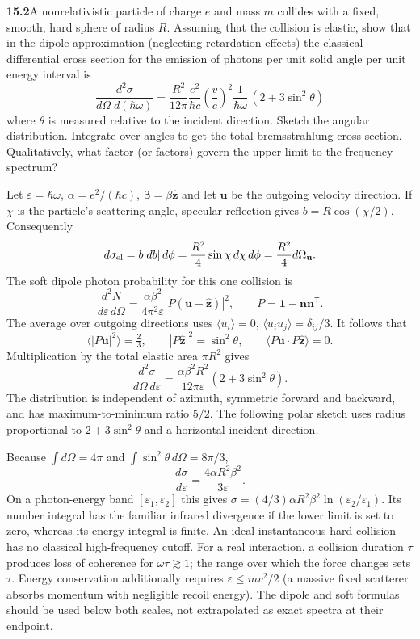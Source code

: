 \par\bigskip
\noindent\textbf{15.2}\quad A nonrelativistic particle of charge $e$ and mass $m$ collides with a fixed, smooth, hard sphere of radius $R$. Assuming that the collision is elastic, show that in the dipole approximation (neglecting retardation effects) the classical differential cross section for the emission of photons per unit solid angle per unit energy interval is
\[
\frac{d^{2}\sigma}{d\Omega\;d(\hbar\omega)}=\frac{R^{2}}{12\pi}\frac{e^{2}}{\hbar c}\left(\frac{v}{c}\right)^{2}\frac{1}{\hbar\omega}\,(2+3\sin^{2}\theta)
\]
where $\theta$ is measured relative to the incident direction. Sketch the angular distribution. Integrate over angles to get the total bremsstrahlung cross section. Qualitatively, what factor (or factors) govern the upper limit to the frequency spectrum?
\solution

Let $\varepsilon=\hbar\omega$, $\alpha=e^2/(\hbar c)$,
$\boldsymbol\beta=\beta\widehat{\mathbf z}$ and let
$\mathbf u$ be the outgoing velocity direction.  If $\chi$ is the
particle's scattering angle, specular reflection gives
$b=R\cos(\chi/2)$.  Consequently
\[
 d\sigma_{\rm el}=b|db|\,d\phi
 =\frac{R^2}4\sin\chi\,d\chi\,d\phi
 =\frac{R^2}4d\Omega_{\mathbf u}.
\]
The soft dipole photon probability for this one collision is
\[
\frac{d^2N}{d\varepsilon\,d\Omega}
=\frac{\alpha\beta^2}{4\pi^2\varepsilon}
 |P(\mathbf u-\widehat{\mathbf z})|^2,
\qquad P=\mathbf1-\mathbf n\mathbf n^{\mathsf T}.
\]
The average over outgoing directions uses
$\langle u_i\rangle=0$, $\langle u_iu_j\rangle=\delta_{ij}/3$.
It follows that
\[
\langle|P\mathbf u|^2\rangle=\tfrac23,\qquad
|P\widehat{\mathbf z}|^2=\sin^2\theta,\qquad
\langle P\mathbf u\cdot P\widehat{\mathbf z}\rangle=0.
\]
Multiplication by the total elastic area $\pi R^2$ gives
\[
\boxed{\frac{d^2\sigma}{d\Omega\,d\varepsilon}
 =\frac{\alpha\beta^2R^2}{12\pi\varepsilon}
 (2+3\sin^2\theta).}
\]
The distribution is independent of azimuth, symmetric forward and
backward, and has maximum-to-minimum ratio $5/2$.  The following
polar sketch uses radius proportional to $2+3\sin^2\theta$ and a
horizontal incident direction.
\begin{center}\end{center}
Because $\int d\Omega=4\pi$ and
$\int\sin^2\theta\,d\Omega=8\pi/3$,
\[
\boxed{\frac{d\sigma}{d\varepsilon}
=\frac{4\alpha R^2\beta^2}{3\varepsilon}.}
\]
On a photon-energy band $[\varepsilon_1,\varepsilon_2]$ this gives
$\sigma=(4/3)\alpha R^2\beta^2\ln(\varepsilon_2/\varepsilon_1)$.
Its number integral has the familiar infrared divergence if the
lower limit is set to zero, whereas its energy integral is finite.
An ideal instantaneous hard collision has no classical high-frequency
cutoff.  For a real interaction, a collision duration $\tau$ produces
loss of coherence for $\omega\tau\gtrsim1$; the range over which
the force changes sets $\tau$.  Energy conservation additionally
requires $\varepsilon\leq mv^2/2$ (a massive fixed scatterer absorbs
momentum with negligible recoil energy).  The dipole and soft
formulas should be used below both scales, not extrapolated as exact
spectra at their endpoint.

